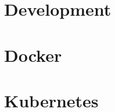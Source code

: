 \documentclass{article}
\begin{document}
\section{Development}

\newpage
\section{Docker}

\newpage
\section{Kubernetes}

\end{document}
